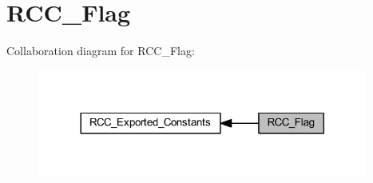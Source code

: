 \hypertarget{group___r_c_c___flag}{}\section{R\+C\+C\+\_\+\+Flag}
\label{group___r_c_c___flag}
Collaboration diagram for R\+C\+C\+\_\+\+Flag\+:
\nopagebreak
\begin{figure}[H]
\begin{center}
\leavevmode
\includegraphics[width=308pt]{group___r_c_c___flag}
\end{center}
\end{figure}
